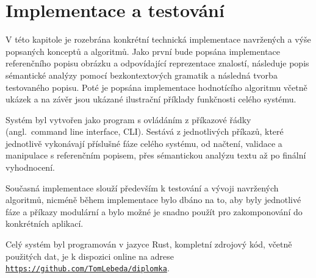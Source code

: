 \clearpage
\section{Implementace a testování}\label{sec:implementace}
V této kapitole je rozebrána konkrétní technická implementace navržených a výše popsaných konceptů a algoritmů.
Jako první bude popsána implementace referenčního popisu obrázku a odpovídající reprezentace znalostí,
následuje popis sémantické analýzy pomocí bezkontextových gramatik a následná tvorba testovaného popisu.
Poté je popsána implementace hodnotícího algoritmu včetně ukázek a na závěr jsou ukázané ilustrační příklady funkčnosti celého systému.

Systém byl vytvořen jako program s ovládáním z příkazové řádky (angl.~command line interface, CLI).
Sestává z jednotlivých příkazů, které jednotlivě vykonávají příslušné fáze celého systému, od načtení, validace a manipulace s referenčním popisem,
přes sémantickou analýzu textu až po finální vyhodnocení.

Současná implementace slouží především k testování a vývoji navržených algoritmů,
nicméně během implementace bylo dbáno na to, aby byly jednotlivé fáze a příkazy modulární a bylo možné je snadno
použít pro zakomponování do konkrétních aplikací.

Celý systém byl programován v jazyce Rust, kompletní zdrojový kód, včetně použitých dat, je k dispozici
online na adrese \href{https://github.com/TomLebeda/diplomka}{\texttt{https://github.com/TomLebeda/diplomka}}.






